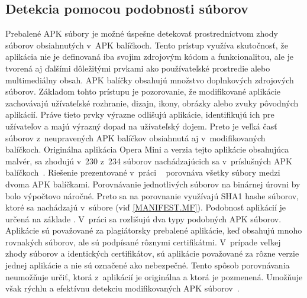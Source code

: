 \subsection{Detekcia pomocou podobnosti súborov}
Prebalené APK súbory je možné úspešne detekovať prostredníctvom zhody súborov obsiahnutých v~APK balíčkoch. Tento prístup využíva skutočnosť, že aplikácia nie je definovaná iba svojim zdrojovým kódom a funkcionalitou, ale je tvorená aj ďalšími dôležitými prvkami ako používateľské prostredie alebo multimediálny obsah. APK balíčky obsahujú množstvo doplnkových zdrojových súborov.  Základom tohto prístupu je pozorovanie, že modifikované aplikácie zachovávajú užívateľské rozhranie, dizajn, ikony, obrázky alebo zvuky pôvodných aplikácií. Práve tieto prvky výrazne odlišujú aplikácie, identifikujú ich pre užívateľov a majú výrazný dopad na užívateľský dojem. Preto je veľká časť súborov z~neupravených APK balíčkov obsiahnutá aj v~modifikovaných balíčkoch. Originálna aplikácia Opera Mini a verzia tejto aplikácie obsahujúca malvér, sa zhodujú v~230 z~234 súborov nachádzajúcich sa v~príslušných APK balíčkoch~\cite{Zhauniarovich2014}. Riešenie prezentované v~práci ~\cite{Zhauniarovich2014} porovnáva všetky súbory medzi dvoma APK balíčkami.  Porovnávanie jednotlivých súborov na binárnej úrovni by bolo výpočtovo náročné. Preto sa na porovnanie využívajú SHA1 hashe súborov, ktoré sa nachádzajú v~súbore  (viď \ref{MANIFEST.MF}). Podobnosť aplikácií je určená na základe . V~práci sa rozlišujú dva typy podobných APK súborov. Aplikácie sú považované za plagiátorsky prebalené aplikácie, keď obsahujú mnoho rovnakých súborov, ale sú podpísané rôznymi certifikátmi. V~prípade veľkej zhody súborov a  identických certifikátov, sú aplikácie považované za rôzne verzie jednej aplikácie a nie sú označené ako nebezpečné. Tento spôsob porovnávania neumožňuje určiť, ktorá z~aplikácií je originálna a ktorá je pozmenená. Umožňuje však rýchlu a efektívnu detekciu modifikovaných APK súborov~\cite{Zhauniarovich2014}. 

